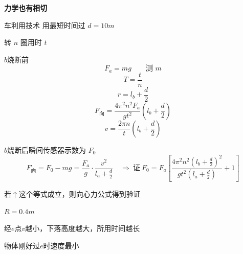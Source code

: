 \begin{problem}
\textbf{力学也有相切}

车利用技术 用最短时间过  $d=10\unit{m}$ %
\begin{solution}





\end{solution}
\end{problem}


转 $n$ 圈用时 $t$

$b$烧断前
\[ F_a=mg\qquad \text{测 }m \]
\[ T=\frac{t}{n} \]
\[ r=l_b+\frac{d}{2} \]
\[ F_{\text{向}}=\frac{4\pi^2n^2F_a}{gt^2}\left(l_b+\frac{d}{2}\right) \]
\[ v=\frac{2\pi n}{t}\left(l_b+\frac{d}{2}\right) \]

$b$烧断后\quad 瞬间传感器示数为 $F_0$
\[ F_{\text{向}}=F_0-mg=\frac{F_a}{g}\cdot\frac{v^2}{l_a+\frac{d}{2}}\quad\Rightarrow\ \text{证}\ F_0=F_a\left[\frac{4\pi^2n^2\left(l_b+\frac{d}{2}\right)^2}{gt^2\left(l_a+\frac{d}{2}\right)}+1\right] \]

若$\uparrow$这个等式成立，则向心力公式得到验证

$R=0.4\unit{m}$

经$e$点$v$越小，下落高度越大，所用时间越长

物体刚好过$e$时速度最小

